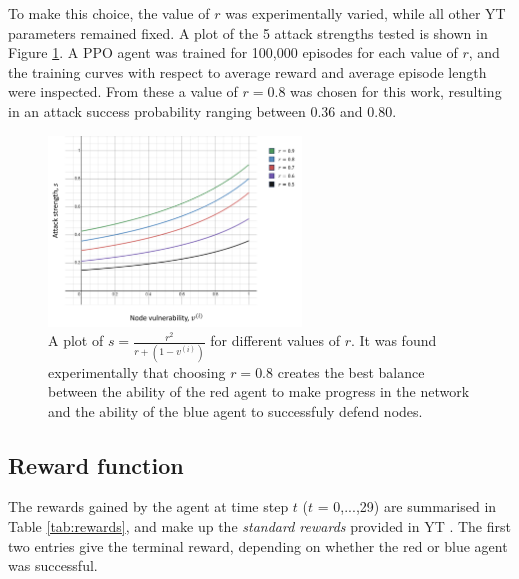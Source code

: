 \documentclass{article}
\begin{document}
To make this choice, the value of $r$ was experimentally varied, while all other YT parameters remained fixed. A plot of the 5 attack strengths tested is shown in Figure \ref{fig:attack strength}. A PPO agent was trained for 100,000 episodes for each value of $r$, and the training curves with respect to average reward and average episode length were inspected. From these a value of $r=0.8$ was chosen for this work, resulting in an attack success probability ranging between 0.36 and 0.80.


\begin{figure}[htp]
    \centering
    \includegraphics[width=0.6\textwidth]{Images/attack_strength.png}
    \caption{A plot of $s = \frac{r^2}{r + (1 - v^{(i)})}$ for different values of $r$. It was found experimentally that choosing $r = 0.8$ creates the best balance between the ability of the red agent to make progress in the network and the ability of the blue agent to successfuly defend nodes. }
    \label{fig:attack strength}
\end{figure}


\subsection{Reward function}
The rewards gained by the agent at time step $t$ ($t$ = 0,...,29) are summarised in Table \ref{tab:rewards}, and make up the \textit{standard rewards} provided in YT \cite{YT}. The first two entries give the terminal reward, depending on whether the red or blue agent was successful.
\end{document}
